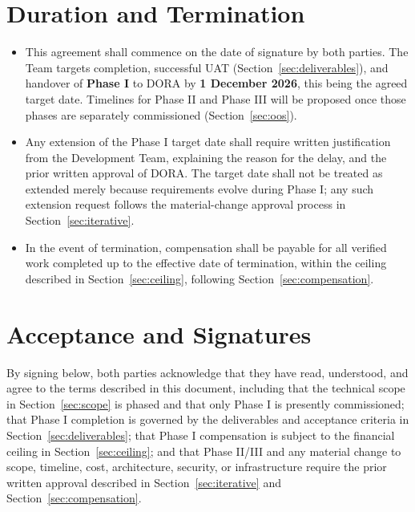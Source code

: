 \documentclass[11pt]{article}
\begin{document}
\section{Duration and Termination}
\label{sec:duration}
\begin{itemize}[leftmargin=1.4em, itemsep=3pt]
\item This agreement shall commence on the date of signature by both parties. The Team targets completion, successful UAT (Section~\ref{sec:deliverables}), and handover of \textbf{Phase I} to DORA by \textbf{1 December 2026}, this being the agreed target date. Timelines for Phase II and Phase III will be proposed once those phases are separately commissioned (Section~\ref{sec:oos}).
\item Any extension of the Phase I target date shall require written justification from the Development Team, explaining the reason for the delay, and the prior written approval of DORA. The target date shall not be treated as extended merely because requirements evolve during Phase I; any such extension request follows the material-change approval process in Section~\ref{sec:iterative}.
\item In the event of termination, compensation shall be payable for all verified work completed up to the effective date of termination, within the ceiling described in Section~\ref{sec:ceiling}, following Section~\ref{sec:compensation}.
\end{itemize}

\section{Acceptance and Signatures}
By signing below, both parties acknowledge that they have read, understood, and agree to the terms described in this document, including that the technical scope in Section~\ref{sec:scope} is phased and that only Phase I is presently commissioned; that Phase I completion is governed by the deliverables and acceptance criteria in Section~\ref{sec:deliverables}; that Phase I compensation is subject to the financial ceiling in Section~\ref{sec:ceiling}; and that Phase II/III and any material change to scope, timeline, cost, architecture, security, or infrastructure require the prior written approval described in Section~\ref{sec:iterative} and Section~\ref{sec:compensation}.
\end{document}
